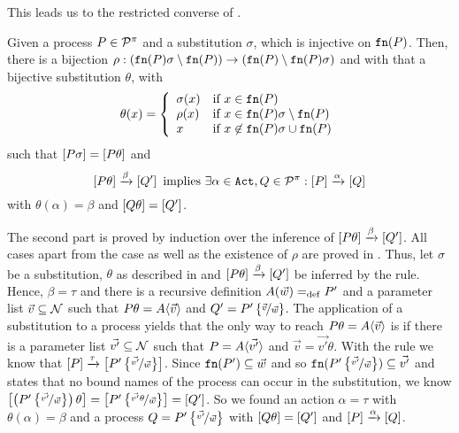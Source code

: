 This leads us to the restricted converse of .

\begin{lemma}
\label{lem_subst_trans_partII}
Given a process $P\in\mathcal P^{\pi}$ and a substitution $\sigma$, which is injective on $\mathtt{fn}(P)$. Then, there is a bijection $\rho: (\mathtt{fn}(P)\sigma\setminus\mathtt{fn}(P)) \rightarrow (\mathtt{fn}(P)\setminus\mathtt{fn}(P)\sigma)$ and with that a bijective substitution $\theta$, with
\[\theta(x)=\left\{\begin{array}{ll}
			\sigma(x) & \text{if } x\in\mathtt{fn}(P) \\
			\rho(x) & \text{if } x\in\mathtt{fn}(P)\sigma\setminus\mathtt{fn}(P) \\
			x & \text{if } x\not\in\mathtt{fn}(P)\sigma\cup\mathtt{fn}(P)  
		\end{array}\right.\]
such that $\left[P\sigma\right]=\left[P\theta\right]$ and
\[\left[P\theta\right]\xrightarrow{\beta}\left[Q'\right] \text{ implies } \exists\alpha\in\mathtt{Act},Q\in\mathcal P^{\pi}:\left[P\right]\xrightarrow{\alpha}\left[Q\right]\]
with $\theta(\alpha)=\beta$ and $\left[Q\theta\right]=\left[Q'\right]$.
\end{lemma}
\begin{prf}
The second part is proved by induction over the inference of $\left[P\theta\right]\xrightarrow{\beta}\left[Q'\right]$. All cases apart from the \ecall{} case as well as the existence of $\rho$ are proved in \cite{sangiorgi}. Thus, let $\sigma$ be a substitution, $\theta$ as described in  and $\left[P\theta\right]\xrightarrow{\beta}\left[Q'\right]$ be inferred by the \ecall{} rule. Hence, $\beta=\tau$ and there is a recursive definition $A(\vec{w})=_{\mathrm{def}}{}P'$ and a parameter list $\vec{v}\subseteq\mathcal N$ such that $P\theta=A\langle\vec{v}\rangle$ and $Q'=P'\left\{\nicefrac{\vec{v}}{\vec{w}}\right\}$. The application of a substitution to a process yields that the only way to reach $P\theta=A\langle\vec{v}\rangle$ is if there is a parameter list $\vec{v'}\subseteq\mathcal N$ such that $P=A\langle\vec{v'}\rangle$ and $\vec{v}=\vec{v'}\theta$. With the \ecall{} rule we know that $\left[P\right]\xrightarrow{\tau}\left[P'\left\{\nicefrac{\vec{v'}}{\vec{w}}\right\}\right]$. Since $\mathtt{fn}(P')\subseteq{\vec{w}}$ and so $\mathtt{fn}(P'\left\{\nicefrac{\vec{v'}}{\vec{w}}\right\})\subseteq{\vec{v'}}$ and  states that no bound names of the process can occur in the substitution, we know $\left[\left(P'\left\{\nicefrac{\vec{v'}}{\vec{w}}\right\}\right)\theta\right]=\left[P'\left\{\nicefrac{\vec{v'}\theta}{\vec{w}}\right\}\right]=\left[Q'\right]$. So we found an action $\alpha=\tau$ with $\theta(\alpha)=\beta$ and a process $Q=P'\left\{\nicefrac{\vec{v'}}{\vec{w}}\right\}$ with $\left[Q\theta\right]=\left[Q'\right]$ and $\left[P\right]\xrightarrow{\alpha}\left[Q\right]$.
\end{prf}

